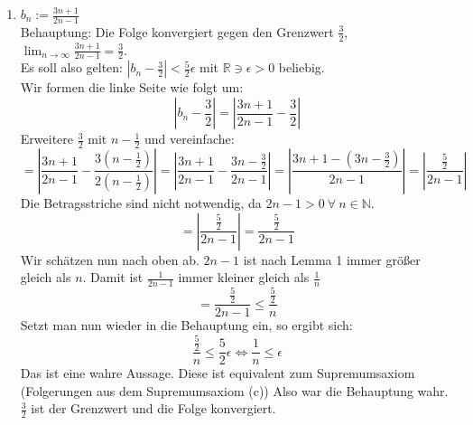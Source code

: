 \documentclass[11pt]{article}
\begin{document}
\begin{enumerate}[ label= (\roman*) ]
        \item \(b_n := \frac{ 3n + 1 }{ 2n - 1 } \) \\
        Behauptung: Die Folge konvergiert gegen den Grenzwert \( \frac{3}{2} \), \(\lim_{n \to \infty } \frac{ 3n + 1 }{ 2n - 1 } = \frac{3}{2} \). \\
        Es soll also gelten: \( |b_n - \frac{3}{2}| < \frac{5}{2} \epsilon \)  mit \( \mathbb{R} \ni \epsilon > 0\) beliebig. \\
        Wir formen die linke Seite wie folgt um:
        \[ |b_n - \frac{3}{2}| = | \frac{ 3n + 1 }{ 2n - 1 } - \frac{3}{2} | \]
        Erweitere \( \frac{3}{2} \) mit \( n - \frac{1}{2} \) und vereinfache:
        \[ 
            = \left| \frac{ 3n + 1 }{ 2n - 1 } - \frac{ 3 (n - \frac{1}{2}) }{ 2 (n - \frac{1}{2}) } \right|
            = \left| \frac{ 3n + 1 }{ 2n - 1 } - \frac{ 3n - \frac{3}{2}}{ 2n - 1 } \right|
            = \left| \frac{ 3n + 1 - ( 3n - \frac{3}{2} ) }{ 2n - 1 } \right|
            = \left| \frac{ \frac{5}{2} }{ 2n - 1 } \right|
        \]
        Die Betragsstriche sind nicht notwendig, da \(2n - 1 > 0 \: \forall \: n \in \mathbb{N} \).
        \[
            = \left| \frac{ \frac{5}{2} }{ 2n - 1 } \right|
            = \frac{ \frac{5}{2} }{ 2n - 1 }
        \]
        Wir schätzen nun nach oben ab. \( 2n - 1\) ist nach Lemma 1 immer größer gleich als \(n\).
        Damit ist \( \frac{1}{ 2n -1 } \) immer kleiner gleich als \( \frac{1}{n} \)
        \[
            = \frac{ \frac{5}{2} }{ 2n - 1 } \leq \frac{ \frac{5}{2} }{ n }
        \]
        Setzt man nun wieder in die Behauptung ein, so ergibt sich:
        \[
            \frac{ \frac{5}{2} }{ n } \leq \frac{5}{2} \epsilon
            \Leftrightarrow \frac{ 1 }{ n } \leq \epsilon
        \]
        Das ist eine wahre Aussage. Diese ist equivalent zum Supremumsaxiom (Folgerungen aus dem Supremumsaxiom (c))
        Also war die Behauptung wahr. \(\frac{3}{2}\) ist der Grenzwert und die Folge konvergiert.


\end{enumerate}
\end{document}
